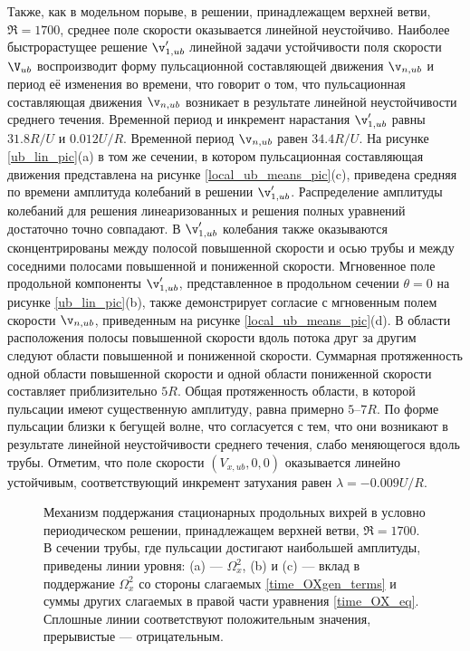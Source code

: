 Также, как в модельном порыве, в решении, принадлежащем верхней ветви, $\Re = 1700$, среднее поле скорости оказывается линейной неустойчиво. Наиболее быстрорастущее решение $\v'_{1,ub}$ линейной задачи устойчивости поля скорости $\V_{ub}$ воспроизводит форму пульсационной составляющей движения $\v_{n,ub}$ и период её изменения во времени, что говорит о том, что пульсационная составляющая движения $\v_{n,ub}$ возникает в результате линейной неустойчивости среднего течения. Временной период и инкремент нарастания $\v'_{1,ub}$ равны $31.8R/U$ и $0.012U/R$. Временной период $\v_{n,ub}$ равен $34.4R/U$. На рисунке \ref{ub_lin_pic}(a) в том же сечении, в котором пульсационная составляющая движения представлена на рисунке \ref{local_ub_means_pic}(c), приведена средняя по времени амплитуда колебаний в решении $\v'_{1,ub}$. Распределение амплитуды колебаний для решения линеаризованных и решения полных уравнений достаточно точно совпадают. В $\v'_{1,ub}$ колебания также оказываются сконцентрированы между полосой повышенной скорости и осью трубы и между соседними полосами повышенной и пониженной скорости. Мгновенное поле продольной компоненты $\v'_{1,ub}$, представленное в продольном сечении $\theta = 0$ на рисунке \ref{ub_lin_pic}(b), также демонстрирует согласие с мгновенным полем скорости $\v_{n,ub}$, приведенным на рисунке \ref{local_ub_means_pic}(d). В области расположения полосы повышенной скорости вдоль потока друг за другим следуют области повышенной и пониженной скорости. Суммарная протяженность одной области повышенной скорости и одной области пониженной скорости составляет приблизительно $5R$. Общая протяженность области, в которой пульсации имеют существенную амплитуду, равна примерно $5$--$7R$. По форме пульсации близки к бегущей волне, что согласуется с тем, что они возникают в результате линейной неустойчивости среднего течения, слабо меняющегося вдоль трубы. Отметим, что поле скорости $(V_{x,ub}, 0, 0)$ оказывается линейно устойчивым, соответствующий инкремент затухания равен $\lambda = -0.009U/R$. 


\begin{figure}
\caption{Механизм поддержания стационарных продольных вихрей в условно периодическом решении, принадлежащем верхней ветви, $\Re = 1700$. В сечении трубы, где пульсации достигают наибольшей амплитуды, приведены линии уровня: (a) --- $\Omega_x^2$, (b) и (c) --- вклад в поддержание $\Omega_x^2$ со стороны слагаемых \eqref{time_OXgen_terms} и суммы других слагаемых в правой части уравнения \eqref{time_OX_eq}. Сплошные линии соответствуют положительным значения, прерывистые --- отрицательным.}
\label{ub_OXgen_pic}
\end{figure}


